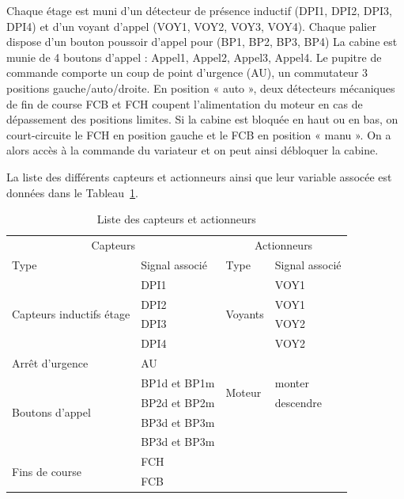 \documentclass[11pt, multicol]{article}
\begin{document}
Chaque étage est muni d’un détecteur de présence inductif (DPI1, DPI2, DPI3, DPI4) et d’un
voyant d’appel (VOY1, VOY2, VOY3, VOY4).
Chaque palier dispose d’un bouton poussoir d’appel pour (BP1, BP2, BP3, BP4)
La cabine est munie de 4 boutons d’appel : Appel1, Appel2, Appel3, Appel4.
Le pupitre de commande comporte un coup de point d’urgence (AU), un commutateur 3 positions
gauche/auto/droite. En position « auto », deux détecteurs mécaniques de fin de course FCB et
FCH coupent l’alimentation du moteur en cas de dépassement des positions limites. Si la cabine
est bloquée en haut ou en bas, on court-circuite le FCH en position gauche et le FCB en position
« manu ». On a alors accès à la commande du variateur et on peut ainsi débloquer la cabine.


La liste des différents capteurs et actionneurs ainsi que leur variable assocée est données dans le Tableau~\ref{tab:capteursActionneurs}.

\begin{table}[ht]
\centering
	\begin{tabular}{|ll || ll|}
	\hline
		\multicolumn{2}{|c||}{Capteurs} 				    & \multicolumn{2}{c|}{Actionneurs}                        \\
		Type                                        & Signal associé & Type                     & Signal associé    \\\hline
		\multirow{4}{*}{Capteurs inductifs étage}   & DPI1           & \multirow{4}{*}{Voyants} & VOY1              \\
		                                            & DPI2           &                          & VOY1              \\
		                                            & DPI3           &                          & VOY2              \\
																						    & DPI4		       &                          & VOY2              \\\hline
  	Arrêt d'urgence										          & AU					   &                          & 		              \\\hline
		\multirow{4}{*}{Boutons d'appel}            & BP1d et BP1m   & \multirow{2}{*}{Moteur}  & monter            \\
		                                            & BP2d et BP2m   &                          & descendre         \\\cline{3-4}
																								& BP3d et BP3m   &                          &                   \\
																								& BP3d et BP3m	 & 													& 									\\\cline{1-2}
		\multirow{2}{*}{Fins de course}             & FCH            &                          &                   \\
																							  & FCB            &                          &                   \\\hline
	\end{tabular}
	\caption{Liste des capteurs et actionneurs}
	\label{tab:capteursActionneurs}
\end{table}
\end{document}
